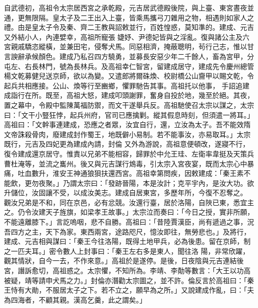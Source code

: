 \begin{pinyinscope}
 自武德初，高祖令太宗居西宮之承乾殿，元吉居武德殿後院，與上臺、東宮晝夜並通，更無限隔。皇太子及二王出入上臺，皆乘馬攜弓刀雜用之物，相遇則如家人之禮。由是皇太子令及秦、齊二王教與詔敕並行，百姓惶惑，莫知準的。建成、元吉又外結小人，內連嬖幸，高祖所寵張
 婕妤、尹德妃皆與之淫亂。復與諸公主及六宮親戚驕恣縱橫，並兼田宅，侵奪犬馬。同惡相濟，掩蔽聰明，茍行己志，惟以甘言諛辭承候顏色。建成乃私召四方驍勇，並募長安惡少年二千餘人，畜為宮甲，分屯左、右長林門，號為長林兵。及高祖幸仁智宮，留建成居守，建成先令慶州總管楊文乾募健兒送京師，欲以為變。又遣郎將爾硃煥、校尉橋公山齎甲以賜文乾，令起兵共相應接。公山、煥等行至豳鄉，懼罪馳告其事。高祖托以他事，
 手詔追建成詣行在所。既至，高祖大怒，建成叩頭謝罪，奮身自投於地，幾至於絕。其夜，置之幕中，令殿中監陳萬福防禦，而文干遂舉兵反。高祖馳使召太宗以謀之，太宗曰：「文干小豎狂悖，起兵州府，官司已應擒剿。縱其假息時刻，但須遣一將耳。」高祖曰：「文幹事連建成，恐應之者眾，汝宜自行，還，立汝為太子。吾不能效隋文帝誅殺骨肉，廢建成封作蜀王，地既僻小易制。若不能事汝，亦易取耳。」太宗既行，元吉及四妃更為建成內請，封倫
 又外為游說，高祖意便頓改，遂寢不行，復令建成還京居守。惟責以兄弟不能相容，歸罪於中允王珪、左衛率韋挺及天策兵曹杜淹等，並流之巂州。後又與元吉謀行鴆毒，引太宗入宮夜宴，既而太宗心中暴痛，吐血數升，淮安王神通狼狽扶還西宮。高祖幸第問疾，因敕建成：「秦王素不能飲，更勿夜聚。」乃謂太宗曰：「發跡晉陽，本是汝計；克平宇內，是汝大功。欲升儲位，汝固讓不受，以成汝美志。建成自居東宮，多歷年所，今復不忍奪之。
 觀汝兄弟是不和，同在京邑，必有忿競。汝還行臺，居於洛陽，自陜已東，悉宜主之。仍令汝建天子旌旗，如梁孝王故事。」太宗泣而奏曰：「今日之授，實非所願，不能遠離膝下。」言訖嗚咽，悲不自勝。高祖曰：「昔陸賈漢臣，尚有遞過之事，況吾四方之主，天下為家。東西兩宮，途路咫尺，憶汝即往，無勞悲也。」及將行，建成、元吉相與謀曰：「秦王今往洛陽，既得土地甲兵，必為後患。留在京師，制之一匹夫耳。」密令數人上封事曰：「秦王左右多是東人，聞往洛
 陽，非常欣躍，觀其情狀，自今一去，不作來意。」高祖於是遂停。是後，日夜陰與元吉連結後宮，譖訴愈切，高祖惑之。太宗懼，不知所為。李靖、李勣等數言：「大王以功高被疑，靖等請申犬馬之力。」封倫亦潛勸太宗圖之，並不許。倫反言於高祖曰：「秦王恃有大勛，不服居太子之下。若不立之，願早為之所。」又說建成作亂，曰：「夫為四海者，不顧其親。漢高乞羹，此之謂矣。」




\end{pinyinscope}
